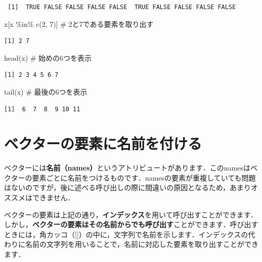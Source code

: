 \documentclass[
  letterpaper,
  DIV=11,
  numbers=noendperiod]{scrreprt}
\newenvironment{Shaded}{\begin{snugshade}}{\end{snugshade}}
\newcommand{\CommentTok}[1]{\textcolor[rgb]{0.37,0.37,0.37}{#1}}
\newcommand{\DecValTok}[1]{\textcolor[rgb]{0.68,0.00,0.00}{#1}}
\newcommand{\FunctionTok}[1]{\textcolor[rgb]{0.28,0.35,0.67}{#1}}
\newcommand{\NormalTok}[1]{\textcolor[rgb]{0.00,0.23,0.31}{#1}}
\newcommand{\SpecialCharTok}[1]{\textcolor[rgb]{0.37,0.37,0.37}{#1}}
\begin{document}
\begin{verbatim}
 [1]  TRUE FALSE FALSE FALSE FALSE  TRUE FALSE FALSE FALSE FALSE
\end{verbatim}

\begin{Shaded}
\begin{Highlighting}[]
\NormalTok{x[x }\SpecialCharTok{\%in\%} \FunctionTok{c}\NormalTok{(}\DecValTok{2}\NormalTok{, }\DecValTok{7}\NormalTok{)] }\CommentTok{\# 2と7である要素を取り出す}
\end{Highlighting}
\end{Shaded}

\begin{verbatim}
[1] 2 7
\end{verbatim}

\begin{Shaded}
\begin{Highlighting}[]
\FunctionTok{head}\NormalTok{(x) }\CommentTok{\# 始めの6つを表示}
\end{Highlighting}
\end{Shaded}

\begin{verbatim}
[1] 2 3 4 5 6 7
\end{verbatim}

\begin{Shaded}
\begin{Highlighting}[]
\FunctionTok{tail}\NormalTok{(x) }\CommentTok{\# 最後の6つを表示}
\end{Highlighting}
\end{Shaded}

\begin{verbatim}
[1]  6  7  8  9 10 11
\end{verbatim}

\hypertarget{ux30d9ux30afux30bfux30fcux306eux8981ux7d20ux306bux540dux524dux3092ux4ed8ux3051ux308b}{%
\section{ベクターの要素に名前を付ける}\label{ux30d9ux30afux30bfux30fcux306eux8981ux7d20ux306bux540dux524dux3092ux4ed8ux3051ux308b}}

ベクターには\textbf{名前（names）}というアトリビュートがあります．このnamesはベクターの要素ごとに名前をつけるものです．namesの要素が重複していても問題はないのですが，後に述べる呼び出しの際に間違いの原因となるため，あまりオススメはできません．

ベクターの要素は上記の通り，\textbf{インデックス}を用いて呼び出すことができます．しかし，\textbf{ベクターの要素はその名前からでも呼び出す}ことができます．呼び出すときには，角カッコ（{[}{]}）の中に，文字列で名前を示します．インデックスの代わりに名前の文字列を用いることで，名前に対応した要素を取り出すことができます．
\end{document}
